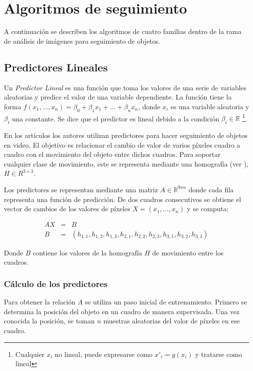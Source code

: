 \section{Algoritmos de seguimiento}
\label{sec:tracking}

A continuación se describen los algoritmos de cuatro familias dentro de la rama
de análisis de imágenes para seguimiento de objetos.

\subsection{Predictores Lineales}

Un \textit{Predictor Lineal} es una función que toma los valores de una serie
de variables aleatorias y predice el valor de una variable dependiente.  La
función tiene la forma $f(x_1, ..., x_n) = \beta_0 + \beta_1 x_1 + \dots +
\beta_n x_n$, donde $x_i$ es una variable aleatoria y $\beta_i$ una constante.
Se dice que el predictor es lineal debido a la condición $\beta_i \in \mathbb{R}$
\footnote{Cualquier $x_i$ no lineal, puede expresarse como $x'_i = g(x_i)$ y tratarse como lineal}.

En los artículos \cite{alp, original-linear-predictors} los autores utilizan
predictores para hacer seguimiento de objetos en video.  El objetivo es
relacionar el cambio de valor de varios píxeles cuadro a cuadro con el
movimiento del objeto entre dichos cuadros.  Para soportar cualquier clase de
movimiento, este se representa mediante una homografía (ver
\cite{homography-estimation}), $H \in R^{3\times3}$.

Los predictores se representan mediante una matriz $A \in \mathbb{R}^{9xn}$
donde cada fila representa una función de predicción.  De dos cuadros
consecutivos se obtiene el vector de cambios de los valores de píxeles $X = (x_1,
\dots, x_n)$ y se computa:

\begin{eqnarray*}
    AX &=& B \\
    B &=& (h_{1,1}, h_{1,2}, h_{1,3}, h_{2,1}, h_{2,2}, h_{2,3}, h_{3,1}, h_{3,2}, h_{3,3})
\end{eqnarray*}

Donde $B$ contiene los valores de la homografía $H$ de movimiento entre los cuadros.

\subsubsection{Cálculo de los predictores}
Para obtener la relación $A$ se utiliza un paso inicial de entrenamiento.
Primero se determina la posición del objeto en un cuadro de manera supervisada.
Una vez conocida la posición, se toman $n$ muestras aleatorias del valor de
píxeles en ese cuadro.

